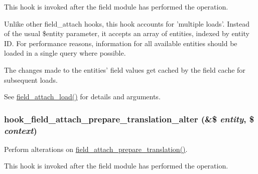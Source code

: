 This hook is invoked after the field module has performed the operation.

Unlike other field\_\-attach hooks, this hook accounts for 'multiple loads'. Instead of the usual \$entity parameter, it accepts an array of entities, indexed by entity ID. For performance reasons, information for all available entities should be loaded in a single query where possible.

The changes made to the entities' field values get cached by the field cache for subsequent loads.

See \hyperlink{group__field__attach_ga1e92543395961c912eb293b50e991586}{field\_\-attach\_\-load()} for details and arguments. \hypertarget{group__field__attach_ga497cd230a4a6bf6318784f6cf08e3758}{
\subsubsection[{hook\_\-field\_\-attach\_\-prepare\_\-translation\_\-alter}]{\setlength{\rightskip}{0pt plus 5cm}hook\_\-field\_\-attach\_\-prepare\_\-translation\_\-alter (\&\$ {\em entity}, \/  \$ {\em context})}}
\label{group__field__attach_ga497cd230a4a6bf6318784f6cf08e3758}
Perform alterations on \hyperlink{group__field__attach_ga7ce84fbf2feb3e4b22bacbe6ed5ed103}{field\_\-attach\_\-prepare\_\-translation()}.

This hook is invoked after the field module has performed the operation.



